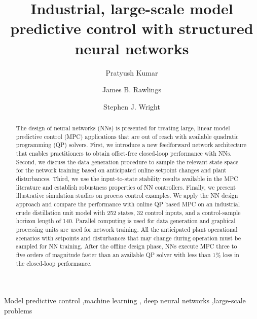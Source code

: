 \documentclass[preprint,5p, twocolumn, authoryear]{elsarticle}
\begin{document}
\begin{frontmatter}


\title{Industrial, large-scale model predictive control 
with structured neural networks}

\author[label1]{Pratyush Kumar}

\author[label1]{James B. Rawlings}

\author[label2]{Stephen J. Wright}

\address[label1]{Department of Chemical Engineering, University of California, Santa Barbara, CA 93106, United States}
\address[label2]{Computer Sciences Department, University of Wisconsin-Madison, Madison, WI 53706, United States}

\begin{abstract}
The design of neural networks (NNs) is presented for treating large, linear
model predictive control (MPC) applications that are out of reach with available
quadratic programming (QP) solvers. First, we introduce a new feedforward
network architecture that enables practitioners to obtain offset-free
closed-loop performance with NNs. Second, we discuss the data generation
procedure to sample the relevant state space for the network training based on
anticipated online setpoint changes and plant disturbances. Third, we use the
input-to-state stability results available in the MPC literature and establish
robustness properties of NN controllers. Finally, we present illustrative
simulation studies on process control examples. We apply the NN design approach
and compare the performance with online QP based MPC on an industrial crude
distillation unit model with 252 states, 32 control inputs, and a control-sample
horizon length of 140. Parallel computing is used for data generation and
graphical processing units are used for network training. All the anticipated
plant operational scenarios with setpoints and disturbances that may change
during operation must be sampled for NN training. After the offline design
phase, NNs execute MPC three to five orders of magnitude faster than an
available QP solver with less than $1\%$ loss in the closed-loop performance.
\end{abstract}

\begin{keyword}
Model predictive control \sep machine learning \sep 
deep neural networks \sep large-scale problems
\end{keyword}

\end{frontmatter}
\end{document}
